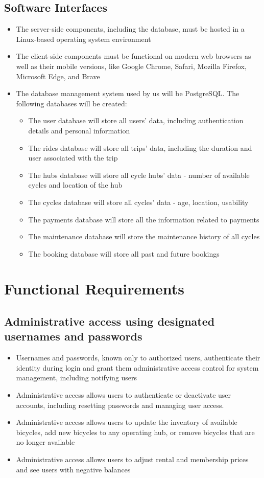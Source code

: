 \documentclass{scrreprt}
\begin{document}
\subsection{Software Interfaces}
\begin{itemize}
    \item The server-side components, including the database, must be hosted in a Linux-based operating system environment
    \item The client-side components must be functional on modern web browsers as well as their mobile versions, like Google Chrome, Safari, Mozilla Firefox, Microsoft Edge, and Brave
    \item The database management system used by us will be PostgreSQL. The following databases will be created:
    \begin{itemize}[label={*}]
        \item The user database will store all users’ data, including authentication details and personal information
        \item The rides database will store all trips’ data, including the duration and user associated with the trip
        \item The hubs database will store all cycle hubs’ data - number of available cycles and location of the hub
        \item The cycles database will store all cycles’ data - age, location, usability
        \item The payments database will store all the information related to payments
        \item The maintenance database will store the maintenance history of all cycles
        \item The booking database will store all past and future bookings
    \end{itemize}
\end{itemize}

\section{Functional Requirements}
\subsection{Administrative access using designated usernames and passwords}
\begin{itemize}
    \item Usernames and passwords, known only to authorized users, authenticate their identity during login and grant them administrative access control for system management, including notifying users
    \item Administrative access allows users to authenticate or deactivate user accounts, including resetting passwords and managing user access.
    \item Administrative access allows users to update the inventory of available bicycles, add new bicycles to any operating hub, or remove bicycles that are no longer available
    \item Administrative access allows users to adjust rental and membership prices and see users with negative balances
\end{itemize}
\end{document}
